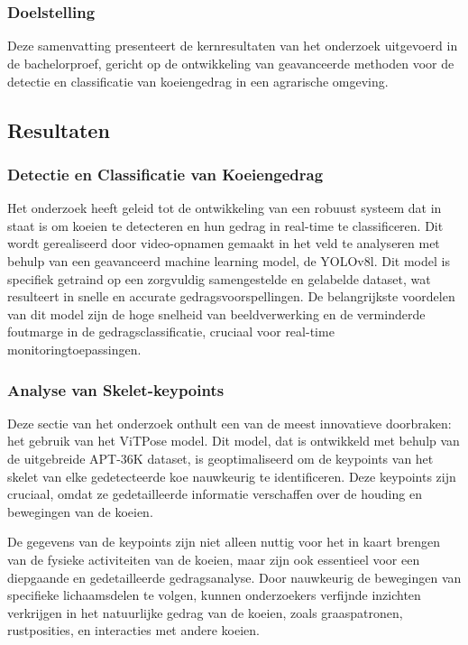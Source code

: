 \chapter{}%
\label{ch:resultaten}

\subsection{Doelstelling}
Deze samenvatting presenteert de kernresultaten van het onderzoek uitgevoerd in de bachelorproef, gericht op de ontwikkeling van geavanceerde methoden voor de detectie en classificatie van koeiengedrag in een agrarische omgeving.

\section{Resultaten}
\subsection{Detectie en Classificatie van Koeiengedrag}
Het onderzoek heeft geleid tot de ontwikkeling van een robuust systeem dat in staat is om koeien te detecteren en hun gedrag in real-time te classificeren. Dit wordt gerealiseerd door video-opnamen gemaakt in het veld te analyseren met behulp van een geavanceerd machine learning model, de YOLOv8l. Dit model is specifiek getraind op een zorgvuldig samengestelde en gelabelde dataset, wat resulteert in snelle en accurate gedragsvoorspellingen. De belangrijkste voordelen van dit model zijn de hoge snelheid van beeldverwerking en de verminderde foutmarge in de gedragsclassificatie, cruciaal voor real-time monitoringtoepassingen.
\subsection{Analyse van Skelet-keypoints}
Deze sectie van het onderzoek onthult een van de meest innovatieve doorbraken: het gebruik van het ViTPose model. Dit model, dat is ontwikkeld met behulp van de uitgebreide APT-36K dataset, is geoptimaliseerd om de keypoints van het skelet van elke gedetecteerde koe nauwkeurig te identificeren. Deze keypoints zijn cruciaal, omdat ze gedetailleerde informatie verschaffen over de houding en bewegingen van de koeien.

De gegevens van de keypoints zijn niet alleen nuttig voor het in kaart brengen van de fysieke activiteiten van de koeien, maar zijn ook essentieel voor een diepgaande en gedetailleerde gedragsanalyse. Door nauwkeurig de bewegingen van specifieke lichaamsdelen te volgen, kunnen onderzoekers verfijnde inzichten verkrijgen in het natuurlijke gedrag van de koeien, zoals graaspatronen, rustposities, en interacties met andere koeien.

